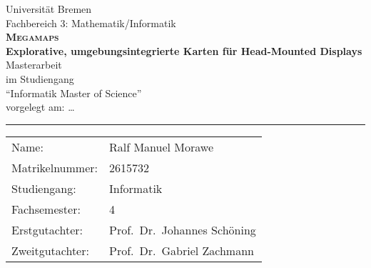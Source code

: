 \begin{titlepage}
\begin{center}
    \LARGE Universität Bremen\\
    \large Fachbereich 3: Mathematik/Informatik\\
    \vspace{2cm}
    \LARGE\textsf{\textbf{\textsc{Megamaps}}}\\
    \Large\textsf{\textbf{Explorative, umgebungsintegrierte Karten für Head-Mounted Displays}} \\
    \vspace{2cm}
    \LARGE Masterarbeit\\
    \vspace{0.5cm}
    \large
    im Studiengang\\
    \enquote{Informatik Master of Science}\\
    \vspace{1cm}
    \normalsize
    vorgelegt am: \dots \\
    \vspace{3.5cm}
\end{center}
\vfill
\noindent
\hrule
\vspace{1em}
\begin{tabular}{ll}
    Name: & {Ralf Manuel Morawe} \\
    Matrikelnummer: & {2615732} \\
    Studiengang: & Informatik\\
    Fachsemester: & 4\\
    Erstgutachter: & {Prof.\ Dr.\ Johannes Schöning} \\
    Zweitgutachter: & {Prof.\ Dr.\ Gabriel Zachmann}
\end{tabular}
\end{titlepage}
\cleardoublepage
